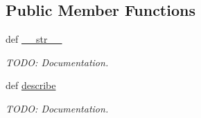\subsection*{Public Member Functions}
\begin{DoxyCompactItemize}
\item 
\hypertarget{classscheduler_1_1models_1_1_user_preference_or_constraint_a1b04b83430b49ef79badd95682e6cf4e}{def \hyperlink{classscheduler_1_1models_1_1_user_preference_or_constraint_a1b04b83430b49ef79badd95682e6cf4e}{\-\_\-\-\_\-str\-\_\-\-\_\-}}\label{classscheduler_1_1models_1_1_user_preference_or_constraint_a1b04b83430b49ef79badd95682e6cf4e}

\begin{DoxyCompactList}\small\item\em T\-O\-D\-O\-: Documentation. \end{DoxyCompactList}\item 
\hypertarget{classscheduler_1_1models_1_1_user_preference_or_constraint_a8198615fa62dee4ea1cb89fe6ab834e0}{def \hyperlink{classscheduler_1_1models_1_1_user_preference_or_constraint_a8198615fa62dee4ea1cb89fe6ab834e0}{describe}}\label{classscheduler_1_1models_1_1_user_preference_or_constraint_a8198615fa62dee4ea1cb89fe6ab834e0}

\begin{DoxyCompactList}\small\item\em T\-O\-D\-O\-: Documentation. \end{DoxyCompactList}\end{DoxyCompactItemize}

